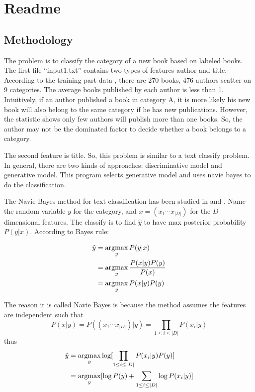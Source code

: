 \documentclass{article}
\newcommand{\argmax}{\operatornamewithlimits{argmax}}
\begin{document}
%


\section{Readme}

\subsection{Methodology}
The problem is to classify the category of a new book based on labeled books. 
The first file ``input1.txt'' contains two types of features author and title.
According to the training part data , there are 270 books, 476 authors scatter on 9 categories.
The average books published by each author is less than 1.
Intuitively, if an author published a book in category A, it is more likely his new book will also belong to the same category if he has new publications.
However, the statistic shows only few authors will publish more than one books.
So, the author may not be the dominated factor to decide whether a book belongs to a category.

The second feature is title.
So, this problem is similar to a text classify problem.
In general, there are two kinds of approaches: discriminative model and generative model.
This program selects generative model and uses navie bayes to do the classification.

The Navie Bayes method for text classification has been studied in \cite{Murphy2006} and \cite{Manning2008IIR}.
Name the random variable $y$ for the category, and $x=(x_1 \cdots x_{|D|})$ for the $D$ dimensional features.
The classify is to find $\hat{y}$ to have max posterior probability $P(y|x)$.
According to Bayes rule:

\begin{align}
\hat{y}&=\argmax_y P(y|x) \\
       &=\argmax_y \frac{P(x|y)P(y)}{P(x)}\\
       &=\argmax_y P(x|y)P(y)
\end{align}

The reason it is called Navie Bayes is because the method assumes the features are independent such that
\begin{equation}
P(x|y) =P((x_1 \cdots x_{|D|})|y)
       =\prod_{1 \leq i \leq |D|} P(x_i|y)
\end{equation}
thus
\begin{align}
\hat{y}&=\argmax_y \log [\prod_{1 \leq i \leq |D|} P(x_i|y)P(y)] \\
	   &=\argmax_y [\log P(y) + \sum\limits_{1 \leq i \leq |D|} \log P(x_i|y)]
\end{align}
\end{document}
